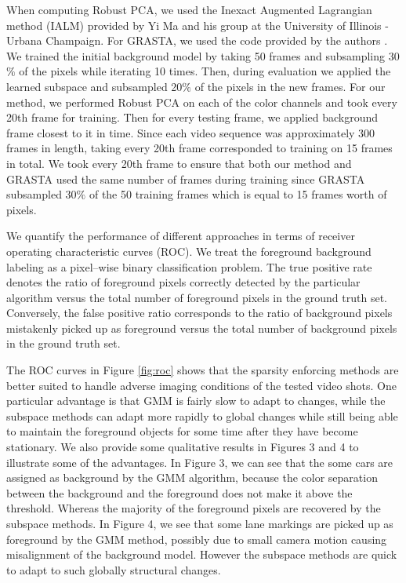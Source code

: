 \documentclass{article}
\begin{document}
When computing Robust PCA, we used the Inexact Augmented Lagrangian method (IALM) \cite{alm} provided by Yi Ma and his group at the University of Illinois - Urbana Champaign. For GRASTA, we used the code provided by the authors \cite{grastaCode}. We trained the initial background model by taking 50 frames and subsampling 30$\%$ of the pixels while iterating 10 times. Then, during evaluation we applied the learned subspace and subsampled 20$\%$ of the pixels in the new frames. For our method, we performed Robust PCA on each of the color channels and took every 20th frame for training. Then for every testing frame, we applied background frame closest to it in time. Since each video sequence was approximately 300 frames in length, taking every 20th frame corresponded to training on 15 frames in total. We took every 20th frame to ensure that both our method and GRASTA used the same number of frames during training since GRASTA subsampled 30$\%$ of the 50 training frames which is equal to 15 frames worth of pixels.

We quantify the performance of different approaches in terms of receiver operating characteristic curves (ROC).  We treat the foreground background labeling as a pixel--wise binary classification problem.  The true positive rate denotes the ratio of foreground pixels correctly detected by the particular algorithm versus the total number of foreground pixels in the ground truth set.  Conversely, the false positive ratio corresponds to the ratio of background pixels mistakenly picked up as foreground versus the total number of background pixels in the ground truth set.

The ROC curves in Figure \ref{fig:roc} shows that the sparsity enforcing methods are better suited to handle adverse imaging conditions of the tested video shots.  One particular advantage is that GMM is fairly slow to adapt to changes, while the subspace methods can adapt more rapidly to global changes while still being able to maintain the foreground objects for some time after they have become stationary. We also provide some qualitative results in Figures 3 and 4 to illustrate some of the advantages.  In Figure 3, we can see that the some cars are assigned as background by the GMM algorithm, because the color separation between the background and the foreground does not make it above the threshold.  Whereas the majority of the foreground pixels are recovered by the subspace methods.  In Figure 4, we see that some lane markings are picked up as foreground by the GMM method, possibly due to small camera motion causing misalignment of the background model.  However the subspace methods are quick to adapt to such globally structural changes.
\end{document}
